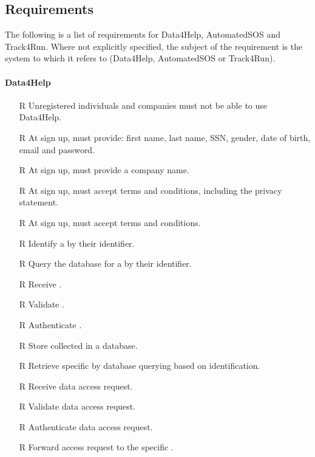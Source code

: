 \documentclass[../../../rasd.tex]{subfiles}
\begin{document}
\subsection{Requirements}
		The following is a list of requirements for Data4Help, AutomatedSOS and Track4Run. Where not explicitly specified, the subject of the requirement is the system to which it refers to (Data4Help, AutomatedSOS or Track4Run).
        \paragraph{Data4Help}
        \begin{itemize}
            \item[R\subs{1}]Unregistered individuals and companies must not be able to use Data4Help.
            \item[R\subs{2}]At sign up,  must provide: first name, last name, SSN, gender, date of birth, email and password.
            \item[R\subs{3}]At sign up,  must provide a company name.
            \item[R\subs{4}]At sign up,  must accept terms and conditions, including the privacy statement.
            \item[R\subs{5}]At sign up,  must accept terms and conditions.
            \item[R\subs{6}]Identify a  by their identifier.
            \item[R\subs{7}]Query the database for a  by their identifier.
            \item[R\subs{8}]Receive .
            \item[R\subs{9}]Validate .
            \item[R\subs{10}]Authenticate .
            \item[R\subs{11}]Store collected  in a database.
            \item[R\subs{12}]Retrieve specific  by database querying based on  identification.
            \item[R\subs{13}]Receive  data access request.
            \item[R\subs{14}]Validate  data access request.
            \item[R\subs{15}]Authenticate  data access request.
            \item[R\subs{16}]Forward  access request to the specific .

\end{itemize}
\end{document}
